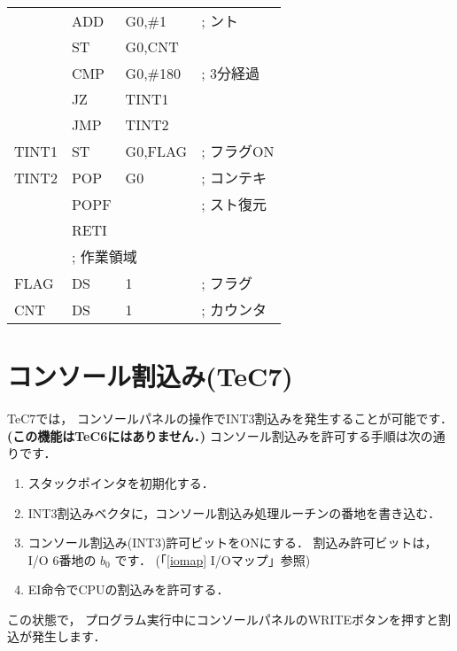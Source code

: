 \begin{center}
{{\begin{center}
{\begin{tabular}{|l|l l l|}
       & ADD    & G0,\#1            & ; ント          \\
       & ST     & G0,CNT            &                 \\
       & CMP    & G0,\#180          & ; 3分経過       \\
       & JZ     & TINT1             &                 \\
       & JMP    & TINT2             &                 \\
TINT1  & ST     & G0,FLAG           & ; フラグON      \\
TINT2  & POP    & G0                & ; コンテキ      \\
       & POPF   &                   & ; スト復元      \\
       & RETI   &                   &                 \\
       & \multicolumn{3}{|l|}{; 作業領域}             \\
FLAG   & DS     & 1                 & ; フラグ        \\
CNT    & DS     & 1                 & ; カウンタ      \\
\hline
\end{tabular}
}
\end{center}
}}
\end{center}

\newpage
\section{コンソール割込み(TeC7)}

TeC7では，
コンソールパネルの操作でINT3割込みを発生することが可能です．
{\bf (この機能はTeC6にはありません．)}
コンソール割込みを許可する手順は次の通りです．

\begin{enumerate}
\item スタックポインタを初期化する．
\item INT3割込みベクタに，コンソール割込み処理ルーチンの番地を書き込む．
\item コンソール割込み(INT3)許可ビットをONにする．
割込み許可ビットは，I/O 6番地の $b_0$ です．
(「\ref{iomap} I/Oマップ」参照)
\item EI命令でCPUの割込みを許可する．
\end{enumerate}

この状態で，
プログラム実行中にコンソールパネルのWRITEボタンを押すと割込が発生します．

